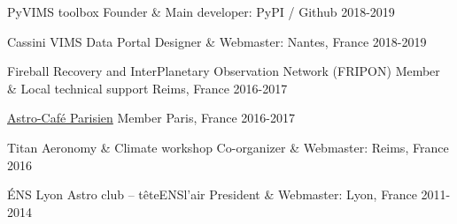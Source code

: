 
\begin{cventries}

  \cventry
    {PyVIMS toolbox}
    {Founder \& Main developer: }
    {PyPI / Github}
    {2018-2019}
    {}

  \cventry
    {Cassini VIMS Data Portal}
    {Designer \& Webmaster: }
    {Nantes, France}
    {2018-2019}
    {}

    \cventry
    {Fireball Recovery and InterPlanetary Observation Network (FRIPON)}
    {Member \& Local technical support}
    {Reims, France}
    {2016-2017}
    {}

  \cventry
    {\href{https://cafeastroparisien.wordpress.com/}{Astro-Café Parisien}}
    {Member}
    {Paris, France}
    {2016-2017}
    {}

  \cventry
    {Titan Aeronomy \& Climate workshop}
    {Co-organizer \& Webmaster: }
    {Reims, France}
    {2016}
    {}

  \cventry
    {ÉNS Lyon Astro club -- têteENSl'air}
    {President \& Webmaster: }
    {Lyon, France}
    {2011-2014}
    {}

\end{cventries}
